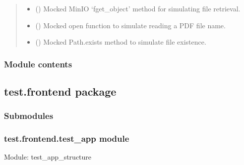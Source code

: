 \documentclass[letterpaper,10pt,english]{sphinxmanual}
\begin{document}
\begin{fulllineitems}
\begin{quote}
\begin{description}
\begin{itemize}
\item {} 
\sphinxAtStartPar
{} () \textendash{} Mocked MinIO ‘fget\_object’ method for simulating file retrieval.

\item {} 
\sphinxAtStartPar
{} () \textendash{} Mocked open function to simulate reading a PDF file name.

\item {} 
\sphinxAtStartPar
{} () \textendash{} Mocked Path.exists method to simulate file existence.

\end{itemize}

\end{description}\end{quote}

\end{fulllineitems}



\subsubsection{Module contents}
\label{\detokenize{test.data_storage:module-test.data_storage}}\label{\detokenize{test.data_storage:module-contents}}
\sphinxstepscope


\subsection{test.frontend package}
\label{\detokenize{test.frontend:test-frontend-package}}\label{\detokenize{test.frontend::doc}}

\subsubsection{Submodules}
\label{\detokenize{test.frontend:submodules}}

\subsubsection{test.frontend.test\_app module}
\label{\detokenize{test.frontend:module-test.frontend.test_app}}\label{\detokenize{test.frontend:test-frontend-test-app-module}}
\sphinxAtStartPar
Module: test\_app\_structure
\end{document}
